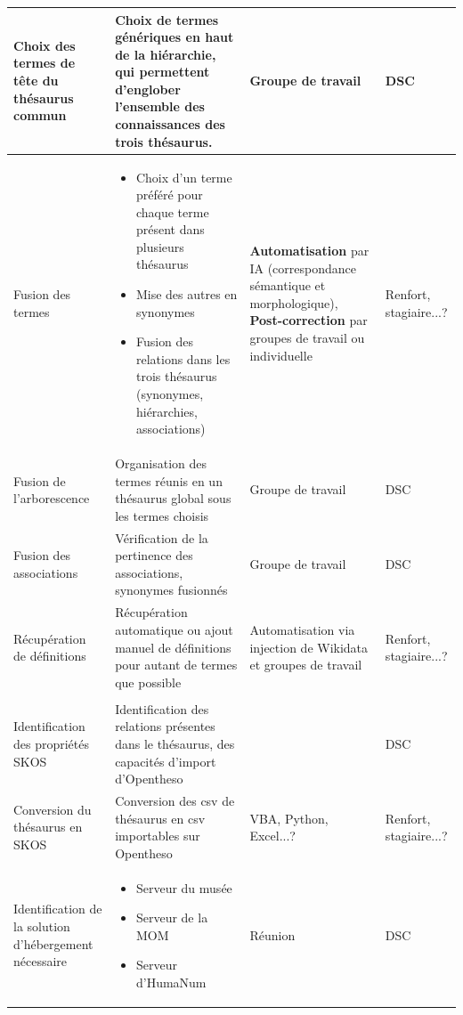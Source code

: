 \begin{longtable}{|p{}|p{}|p{}|p{}|}
	Choix des termes de tête du thésaurus commun & Choix de termes génériques en haut de la hiérarchie, qui permettent d'englober l'ensemble des connaissances des trois thésaurus. & Groupe de travail & DSC \\
	\hline
	Fusion des termes &
	\begin{itemize}\setlength{\itemsep}{0pt}
		\item Choix d'un terme préféré pour chaque terme présent dans plusieurs thésaurus
		\item Mise des autres en synonymes
		\item Fusion des relations dans les trois thésaurus (synonymes, hiérarchies, associations)
	\end{itemize}
	& \textbf{Automatisation} par IA (correspondance sémantique et morphologique), \newline \textbf{Post-correction} par groupes de travail ou individuelle & Renfort, stagiaire...? \\
	\hline
	Fusion de l'arborescence & Organisation des termes réunis en un thésaurus global sous les termes choisis & Groupe de travail & DSC \\
	\hline
	Fusion des associations & Vérification de la pertinence des associations, synonymes fusionnés & Groupe de travail & DSC \\
	\hline
	Récupération de définitions & Récupération automatique ou ajout manuel de définitions pour autant de termes que possible & Automatisation via injection de Wikidata et groupes de travail & Renfort, stagiaire...? \\
	\hline
	\rowcolor{lightgray}
	\multicolumn{4}{|c|}{\textbf{Préparation pour l'import}} \\
	\hline
	Identification des propriétés SKOS & Identification des relations présentes dans le thésaurus, des capacités d'import d'Opentheso & & DSC \\
	\hline
	Conversion du thésaurus en SKOS & Conversion des csv de thésaurus en csv importables sur Opentheso & VBA, Python, Excel...? & Renfort, stagiaire...? \\
	\hline
	Identification de la solution d'hébergement nécessaire &
	\begin{itemize}\setlength{\itemsep}{0pt}
		\item Serveur du musée
		\item Serveur de la MOM
		\item Serveur d'HumaNum
	\end{itemize}
	& Réunion & DSC \\

\end{longtable}
